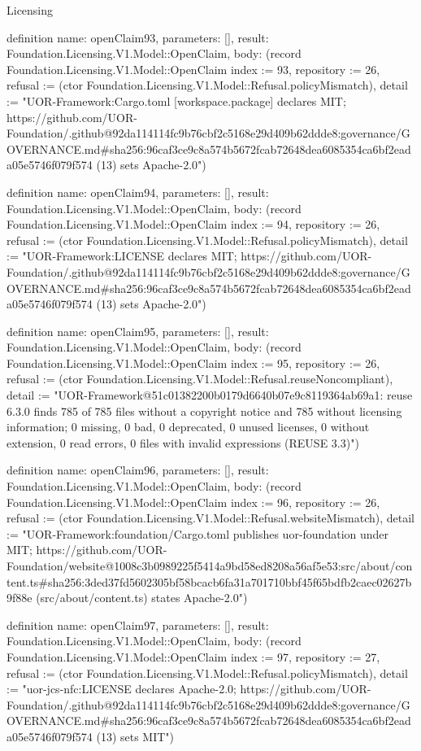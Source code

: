\begin{lexlean}{Licensing}
\begin{semanticmodule}
definition{
  name: openClaim93,
  parameters: [],
  result: Foundation.Licensing.V1.Model::OpenClaim,
  body: (record Foundation.Licensing.V1.Model::OpenClaim {index := 93, repository := 26, refusal := (ctor Foundation.Licensing.V1.Model::Refusal.policyMismatch), detail := "UOR-Framework:Cargo.toml [workspace.package] declares MIT; https://github.com/UOR-Foundation/.github@92da114114fc9b76cbf2c5168e29d409b62ddde8:governance/GOVERNANCE.md#sha256:96caf3ce9c8a574b5672fcab72648dea6085354ca6bf2eada05e5746f079f574 (13) sets Apache-2.0"})
}

definition{
  name: openClaim94,
  parameters: [],
  result: Foundation.Licensing.V1.Model::OpenClaim,
  body: (record Foundation.Licensing.V1.Model::OpenClaim {index := 94, repository := 26, refusal := (ctor Foundation.Licensing.V1.Model::Refusal.policyMismatch), detail := "UOR-Framework:LICENSE declares MIT; https://github.com/UOR-Foundation/.github@92da114114fc9b76cbf2c5168e29d409b62ddde8:governance/GOVERNANCE.md#sha256:96caf3ce9c8a574b5672fcab72648dea6085354ca6bf2eada05e5746f079f574 (13) sets Apache-2.0"})
}

definition{
  name: openClaim95,
  parameters: [],
  result: Foundation.Licensing.V1.Model::OpenClaim,
  body: (record Foundation.Licensing.V1.Model::OpenClaim {index := 95, repository := 26, refusal := (ctor Foundation.Licensing.V1.Model::Refusal.reuseNoncompliant), detail := "UOR-Framework@51c01382200b0179d6640b07e9c8119364ab69a1: reuse 6.3.0 finds 785 of 785 files without a copyright notice and 785 without licensing information; 0 missing, 0 bad, 0 deprecated, 0 unused licenses, 0 without extension, 0 read errors, 0 files with invalid expressions (REUSE 3.3)"})
}

definition{
  name: openClaim96,
  parameters: [],
  result: Foundation.Licensing.V1.Model::OpenClaim,
  body: (record Foundation.Licensing.V1.Model::OpenClaim {index := 96, repository := 26, refusal := (ctor Foundation.Licensing.V1.Model::Refusal.websiteMismatch), detail := "UOR-Framework:foundation/Cargo.toml publishes uor-foundation under MIT; https://github.com/UOR-Foundation/website@1008c3b0989225f5414a9bd58ed8208a56af5e53:src/about/content.ts#sha256:3ded37fd5602305bf58bcacb6fa31a701710bbf45f65bdfb2caec02627b9f88e (src/about/content.ts) states Apache-2.0"})
}

definition{
  name: openClaim97,
  parameters: [],
  result: Foundation.Licensing.V1.Model::OpenClaim,
  body: (record Foundation.Licensing.V1.Model::OpenClaim {index := 97, repository := 27, refusal := (ctor Foundation.Licensing.V1.Model::Refusal.policyMismatch), detail := "uor-jcs-nfc:LICENSE declares Apache-2.0; https://github.com/UOR-Foundation/.github@92da114114fc9b76cbf2c5168e29d409b62ddde8:governance/GOVERNANCE.md#sha256:96caf3ce9c8a574b5672fcab72648dea6085354ca6bf2eada05e5746f079f574 (13) sets MIT"})
}


\end{semanticmodule}
\end{lexlean}
